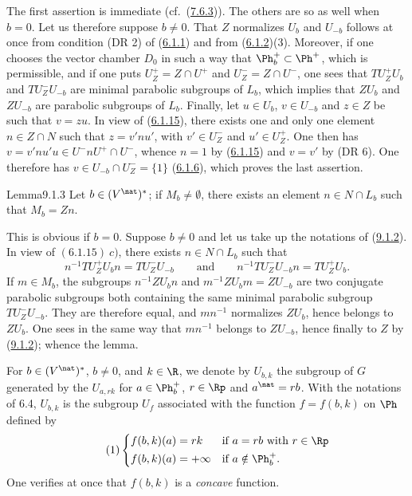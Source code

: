\documentclass[12pt,a4paper,oneside,english]{smfart}
\makeatletter
\newcommand{\btanchor}[1]{\leavevmode\Hy@raisedlink{\hypertarget{bt:#1}{}}}
\newcommand{\btpageanchor}[1]{\Hy@raisedlink{\hypertarget{p:#1}{}}}
\newcommand{\btref}[1]{\hyperlink{bt:#1}{#1}}
\newcommand{\btpage}[1]{\marginnote{p.~#1}\btpageanchor{#1}}
\newcommand{\pg}[1]{\btpage{#1}}
\theoremstyle{definition}
\theoremstyle{bt}
\makeatother
\begin{document}
The first assertion is immediate (cf.\ (\btref{7.6.3})). The others are so as well when $b=0$.
Let us therefore suppose $b\neq0$. That $Z$ normalizes $U_b$ and $U_{-b}$ follows at
once from condition (DR 2) of (\btref{6.1.1}) and from (\btref{6.1.2})(3). Moreover, if one chooses the
vector chamber $D_0$ in such a way that $\Ph^+_b\subset\Ph^+$, which is permissible, and
if one puts $U^+_Z=Z\cap U^+$ and $U^-_Z=Z\cap U^-$, one sees that $TU^+_ZU_b$ and
$TU^-_ZU_{-b}$ are minimal parabolic subgroups of $L_b$, which implies that $ZU_b$ and
$ZU_{-b}$ are parabolic subgroups of $L_b$. Finally, let $u\in U_b$, $v\in U_{-b}$ and
$z\in Z$ be such that $v=zu$. In view of (\btref{6.1.15}), there exists one and only one element
$n\in Z\cap N$ such that $z=v'nu'$, with $v'\in U^-_Z$ and $u'\in U^+_Z$. One then has
$v=v'nu'u\in U^-nU^+\cap U^-$, whence $n=1$ by (\btref{6.1.15}) and $v=v'$ by (DR 6). One
therefore has $v\in U_{-b}\cap U^-_Z=\{1\}$ (\btref{6.1.6}), which proves the last assertion.

\begin{stmt}{Lemma}{9.1.3}\btanchor{9.1.3}
Let $b\in(V^\nat)^*$; if $M_b\neq\emptyset$, there exists an element $n\in N\cap L_b$
such that $M_b=Zn$.
\end{stmt}

This is obvious if $b=0$. Suppose $b\neq0$ and let us take up the notations of (\btref{9.1.2}).
In view of $(6.1.15)\ c)$, there exists $n\in N\cap L_b$ such that
\[
n^{-1}TU^+_ZU_bn=TU^-_ZU_{-b}\qquad\text{and}\qquad n^{-1}TU^-_ZU_{-b}n=TU^+_ZU_b .
\]
\pg{197}
If $m\in M_b$, the subgroups $n^{-1}ZU_bn$ and $m^{-1}ZU_bm=ZU_{-b}$ are two conjugate
parabolic subgroups both containing the same minimal parabolic subgroup
$TU^-_ZU_{-b}$. They are therefore equal, and $mn^{-1}$ normalizes $ZU_b$, hence belongs
to $ZU_b$. One sees in the same way that $mn^{-1}$ belongs to $ZU_{-b}$, hence finally
to $Z$ by (\btref{9.1.2}); whence the lemma.

\btanchor{9.1.4}
For $b\in(V^\nat)^*$, $b\neq0$, and $k\in\R$, we denote by $U_{b,k}$ the subgroup of $G$
generated by the $U_{a,rk}$ for $a\in\Ph^+_b$, $r\in\Rp$ and $a^\nat=rb$. With the
notations of 6.4, $U_{b,k}$ is the subgroup $U_f$ associated with the function
$f=f(b,k)$ on $\Ph$ defined by
\begin{equation}\tag{1}
\left\{
\begin{aligned}
f(b,k)(a)&=rk &&\text{if }a=rb\text{ with }r\in\Rp\\
f(b,k)(a)&=+\infty &&\text{if }a\notin\Ph^+_b .
\end{aligned}
\right.
\end{equation}
One verifies at once that $f(b,k)$ is a \emph{concave} function.
\end{document}
